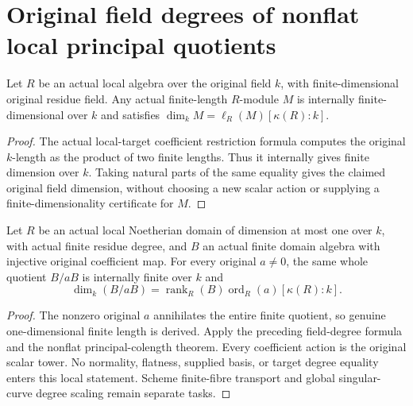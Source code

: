 \section{Original field degrees of nonflat local principal quotients}

\begin{theorem}
\label{thm:fc-local-length-field-degree}
\leanok
{}
Let $R$ be an actual local algebra over the original field $k$, with
finite-dimensional original residue field.  Any actual finite-length
$R$-module $M$ is internally finite-dimensional over $k$ and satisfies
$\dim_k M=\ell_R(M)[\kappa(R):k]$.
\end{theorem}
\begin{proof}
The actual local-target coefficient restriction formula computes the
original $k$-length as the product of two finite lengths.  Thus it internally
gives finite dimension over $k$.  Taking natural parts of the same equality
gives the claimed original field dimension, without choosing a new scalar
action or supplying a finite-dimensionality certificate for $M$.
\end{proof}

\begin{theorem}
\label{thm:fc-nonflat-local-principal-field-degree}
\leanok
{}
Let $R$ be an actual local Noetherian domain of dimension at most one over
$k$, with actual finite residue degree, and $B$ an actual finite domain
algebra with injective original coefficient map.  For every original
$a\ne0$, the same whole quotient $B/aB$ is internally finite over $k$ and
\[
 \dim_k(B/aB)=\operatorname{rank}_R(B)
 \operatorname{ord}_R(a)[\kappa(R):k].
\]
\end{theorem}
\begin{proof}
The nonzero original $a$ annihilates the entire finite quotient, so genuine
one-dimensional finite length is derived.  Apply the preceding field-degree
formula and the nonflat principal-colength theorem.  Every coefficient
action is the original scalar tower.  No normality, flatness, supplied
basis, or target degree equality enters this local statement.  Scheme
finite-fibre transport and global singular-curve degree scaling remain
separate tasks.
\end{proof}
